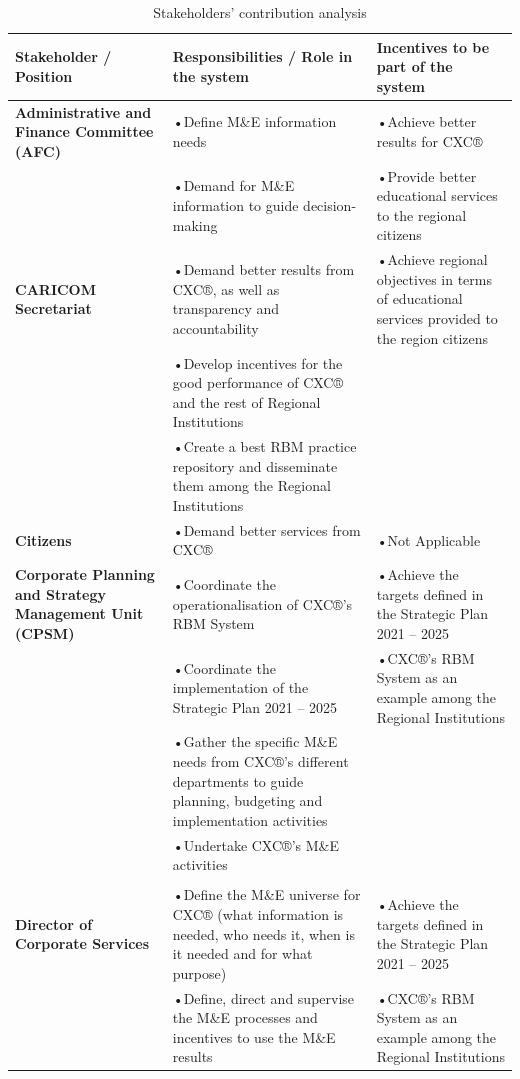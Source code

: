 \documentclass[
  10pt,
]{book}
\begin{document}
\begin{table}

\caption{\label{tab:unnamed-chunk-8}Stakeholders’ contribution analysis}
\centering
\fontsize{12}{14}\selectfont
\begin{tabu} to 
\hline
Stakeholder / Position & Responsibilities / Role in the system & Incentives to be part of the system\\
\hline
\textbf{Administrative and Finance Committee (AFC)} & •Define M\&E information needs & •Achieve better results for CXC®\\
\hline
\textbf{} & •Demand for M\&E information to guide decision-making & •Provide better educational services to the regional citizens\\
\hline
\textbf{CARICOM Secretariat} & •Demand better results from CXC®, as well as transparency and accountability & •Achieve regional objectives in terms of educational services provided to the region citizens\\
\hline
\textbf{} & •Develop incentives for the good performance of CXC® and the rest of Regional Institutions & \\
\hline
\textbf{} & •Create a best RBM practice repository and disseminate them among the Regional Institutions & \\
\hline
\textbf{Citizens} & •Demand better services from CXC® & •Not Applicable\\
\hline
\textbf{Corporate Planning and Strategy Management Unit (CPSM)} & •Coordinate the operationalisation of CXC®’s RBM System & •Achieve the targets defined in the Strategic Plan 2021 – 2025\\
\hline
\textbf{} & •Coordinate the implementation of the Strategic Plan 2021 – 2025 & •CXC®’s RBM System as an example among the Regional Institutions\\
\hline
\textbf{} & •Gather the specific M\&E needs from CXC®’s different departments to guide planning, budgeting and implementation activities & \\
\hline
\textbf{} & •Undertake CXC®’s M\&E activities & \\
\hline
\textbf{} &  \vphantom{1} & \\
\hline
\textbf{Director of Corporate Services} & •Define the M\&E universe for CXC® (what information is needed, who needs it, when is it needed and for what purpose) & •Achieve the targets defined in the Strategic Plan 2021 – 2025\\
\hline
\textbf{} & •Define, direct and supervise the M\&E processes and incentives to use the M\&E results & •CXC®’s RBM System as an example among the Regional Institutions\\

\end{tabu}
\end{table}
\end{document}

